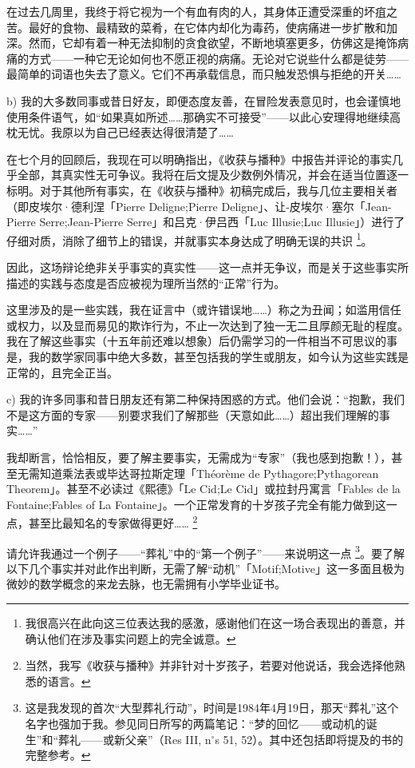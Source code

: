 在过去几周里，我终于将它视为一个有血有肉的人，其身体正遭受深重的坏疽之苦。最好的食物、最精致的菜肴，在它体内却化为毒药，使病痛进一步扩散和加深。然而，它却有着一种无法抑制的贪食欲望，不断地填塞更多，仿佛这是掩饰病痛的方式——一种它无论如何也不愿正视的病痛。无论对它说些什么都是徒劳——最简单的词语也失去了意义。它们不再承载信息，而只触发恐惧与拒绝的开关……

b) 我的大多数同事或昔日好友，即便态度友善，在冒险发表意见时，也会谨慎地使用条件语气，如“如果真如所述……那确实不可接受”——以此心安理得地继续高枕无忧。我原以为自己已经表达得很清楚了……

在七个月的回顾后，我现在可以明确指出，《收获与播种》中报告并评论的事实几乎全部，其真实性无可争议。我将在后文提及少数例外情况，并会在适当位置逐一标明。对于其他所有事实，在《收获与播种》初稿完成后，我与几位主要相关者（即皮埃尔·德利涅「Pierre Deligne;Pierre Deligne」、让-皮埃尔·塞尔「Jean-Pierre Serre;Jean-Pierre Serre」和吕克·伊吕西「Luc Illusie;Luc Illusie」）进行了仔细对质，消除了细节上的错误，并就事实本身达成了明确无误的共识 \footnote{我很高兴在此向这三位表达我的感激，感谢他们在这一场合表现出的善意，并确认他们在涉及事实问题上的完全诚意。}。

因此，这场辩论绝非关乎事实的真实性——这一点并无争议，而是关于这些事实所描述的实践与态度是否应被视为理所当然的“正常”行为。

这里涉及的是一些实践，我在证言中（或许错误地……）称之为丑闻；如滥用信任或权力，以及显而易见的欺诈行为，不止一次达到了独一无二且厚颜无耻的程度。我在了解这些事实（十五年前还难以想象）后仍需学习的一件相当不可思议的事是，我的数学家同事中绝大多数，甚至包括我的学生或朋友，如今认为这些实践是正常的，且完全正当。

c) 我的许多同事和昔日朋友还有第二种保持困惑的方式。他们会说：“抱歉，我们不是这方面的专家——别要求我们了解那些（天意如此……）超出我们理解的事实……”

我却断言，恰恰相反，要了解主要事实，无需成为“专家”（我也感到抱歉！），甚至无需知道乘法表或毕达哥拉斯定理「Théorème de Pythagore;Pythagorean Theorem」。甚至不必读过《熙德》「Le Cid;Le Cid」或拉封丹寓言「Fables de la Fontaine;Fables of La Fontaine」。一个正常发育的十岁孩子完全有能力做到这一点，甚至比最知名的专家做得更好…… \footnote{当然，我写《收获与播种》并非针对十岁孩子，若要对他说话，我会选择他熟悉的语言。}

请允许我通过一个例子——“葬礼”中的“第一个例子”——来说明这一点 \footnote{这是我发现的首次“大型葬礼行动”，时间是1984年4月19日，那天“葬礼”这个名字也强加于我。参见同日所写的两篇笔记：“梦的回忆——或动机的诞生”和“葬礼——或新父亲”（Res III, n${}^{\circ}$s 51, 52）。其中还包括即将提及的书的完整参考。}。要了解以下几个事实并对此作出判断，无需了解“动机”「Motif;Motive」这一多面且极为微妙的数学概念的来龙去脉，也无需拥有小学毕业证书。

